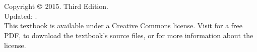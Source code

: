\chapter*{}
\vfill

\noindent Copyright $\copyright$ 2015. Third Edition. \\
Updated: \versiondate. \\

\noindent This textbook is available under a Creative Commons license. Visit  for a free PDF, to download the textbook's source files, or for more information about the license. \\


